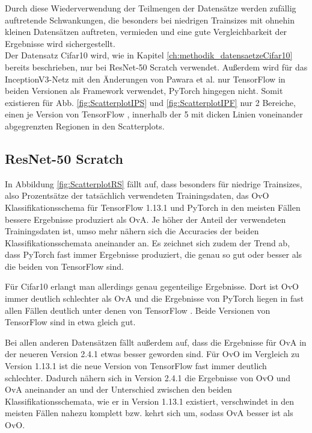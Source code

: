 Durch diese Wiederverwendung der Teilmengen der Datensätze werden zufällig auftretende Schwankungen, die besonders bei niedrigen Trainsizes mit ohnehin kleinen Datensätzen auftreten, vermieden und eine gute Vergleichbarkeit der Ergebnisse wird sichergestellt.\\

Der Datensatz Cifar10 \cite{cifar10} wird, wie in Kapitel \ref{ch:methodik_datensaetzeCifar10} bereits beschrieben, nur bei ResNet-50 Scratch verwendet. Außerdem wird für das InceptionV3-Netz mit den Änderungen von Pawara et al. \cite{pawaraWebsiteCode} nur TensorFlow \cite{tensorflow} in beiden Versionen als Framework verwendet, PyTorch \cite{pytorch} hingegen nicht. Somit existieren für Abb. \ref{fig:ScatterplotIPS} und \ref{fig:ScatterplotIPF} nur 2 Bereiche, einen je Version von TensorFlow \cite{tensorflow}, innerhalb der 5 mit dicken Linien voneinander abgegrenzten Regionen in den Scatterplots.


\subsection{ResNet-50 Scratch}
\label{ch:ergebnisseOvOOvA-RS}
In Abbildung \ref{fig:ScatterplotRS} fällt auf, dass besonders für niedrige Trainsizes, also Prozentsätze der tatsächlich verwendeten Trainingsdaten, das OvO Klassifikationsschema für TensorFlow 1.13.1 \cite{tensorflow} und PyTorch \cite{pytorch} in den meisten Fällen bessere Ergebnisse produziert als OvA. Je höher der Anteil der verwendeten Trainingsdaten ist, umso mehr nähern sich die Accuracies der beiden Klassifikationsschemata aneinander an. Es zeichnet sich zudem der Trend ab, dass PyTorch \cite{pytorch} fast immer Ergebnisse produziert, die genau so gut oder besser als die beiden von TensorFlow \cite{tensorflow} sind.


Für Cifar10 \cite{cifar10} erlangt man allerdings genau gegenteilige Ergebnisse. Dort ist OvO immer deutlich schlechter als OvA und die Ergebnisse von PyTorch \cite{pytorch} liegen in fast allen Fällen deutlich unter denen von TensorFlow \cite{tensorflow}. Beide Versionen von TensorFlow \cite{tensorflow} sind in etwa gleich gut.

Bei allen anderen Datensätzen fällt außerdem auf, dass die Ergebnisse für OvA in der neueren Version 2.4.1 etwas besser geworden sind. Für OvO im Vergleich zu Version 1.13.1 ist die neue Version von TensorFlow \cite{tensorflow} fast immer deutlich schlechter. Dadurch nähern sich in Version 2.4.1 die Ergebnisse von OvO und OvA aneinander an und der Unterschied zwischen den beiden Klassifikationsschemata, wie er in Version 1.13.1 existiert, verschwindet in den meisten Fällen nahezu komplett bzw. kehrt sich um, sodass OvA besser ist als OvO.

